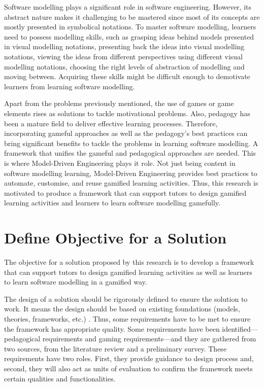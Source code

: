 \documentclass[12pt, a4paper]{report} \usepackage[titletoc]{appendix}
\begin{document}
Software modelling plays a significant role in software engineering. However, its abstract nature makes it challenging to be mastered since most of its concepts are mostly presented in symbolical notations. To master software modelling, learners need to possess modelling skills, such as grasping ideas behind models presented in visual modelling notations, presenting back the ideas into visual modelling notations, viewing the ideas from different perspectives using different visual modelling notations, choosing the right levels of abstraction of modelling and moving between. Acquiring these skills might be difficult enough to demotivate learners from learning software modelling.

Apart from the problems previously mentioned, the use of games or game elements rises as solutions to tackle motivational problems. Also, pedagogy has been a mature field to deliver effective learning processes. Therefore, incorporating gameful approaches as well as the pedagogy's best practices can bring significant benefits to tackle the problems in learning software modelling. A framework that unifies the gameful and pedagogical approaches are needed. This is where Model-Driven Engineering plays it role. Not just being content in software modelling learning, Model-Driven Engineering provides best practices to automate, customise, and reuse gamified learning activities. Thus, this research is motivated to produce a framework that can support tutors to design gamified learning activities and learners to learn software modelling gamefully.


\section{Define Objective for a Solution}
The objective for a solution proposed by this research is to develop a framework that can support tutors to design gamified learning activities as well as learners to learn software modelling in a gamified way. 

The design of a solution should be rigorously defined to ensure the solution to work. It means the design should be based on existing foundations (models, theories, frameworks, etc.) \cite{von2004design}. Thus, some requirements have to be met to ensure the framework has appropriate quality. Some requirements have been identified---pedagogical requirements and gaming requirements---and they are gathered from two sources, from the literature review and a preliminary survey. These requirements have two roles. First, they provide guidance to design process and, second, they will also act as units of evaluation to confirm the framework meets certain qualities and functionalities.
\end{document}
